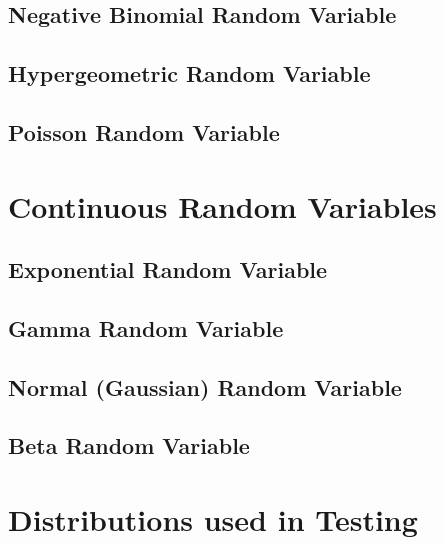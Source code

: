 \documentclass[
]{krantz}
\begin{document}
\hypertarget{negative-binomial-random-variable}{%
\subsection{Negative Binomial Random Variable}\label{negative-binomial-random-variable}}

\hypertarget{hypergeometric-random-variable}{%
\subsection{Hypergeometric Random Variable}\label{hypergeometric-random-variable}}

\hypertarget{poisson-random-variable}{%
\subsection{Poisson Random Variable}\label{poisson-random-variable}}

\hypertarget{continuous-random-variables}{%
\section{Continuous Random Variables}\label{continuous-random-variables}}

\hypertarget{exponential-random-variable}{%
\subsection{Exponential Random Variable}\label{exponential-random-variable}}

\hypertarget{gamma-random-variable}{%
\subsection{Gamma Random Variable}\label{gamma-random-variable}}

\hypertarget{normal-gaussian-random-variable}{%
\subsection{Normal (Gaussian) Random Variable}\label{normal-gaussian-random-variable}}

\hypertarget{beta-random-variable}{%
\subsection{Beta Random Variable}\label{beta-random-variable}}

\hypertarget{distributions-used-in-testing}{%
\section{Distributions used in Testing}\label{distributions-used-in-testing}}
\end{document}
